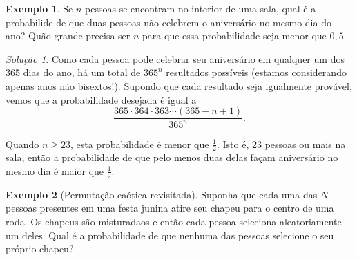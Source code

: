\documentclass[]{book}
\theoremstyle{definition}
\theoremstyle{definition}
\newtheorem{example}{Exemplo}[chapter]
\theoremstyle{definition}
\theoremstyle{remark}
\newtheorem*{solution}{Solução}
\begin{document}
\begin{example}
\protect\hypertarget{exm:unnamed-chunk-112}{}{\label{exm:unnamed-chunk-112} }Se \(n\) pessoas se encontram no interior de uma sala, qual é a probabilide de que duas pessoas não celebrem o aniversário no mesmo dia do ano?
Quão grande precisa ser \(n\) para que essa probabilidade seja menor que \(0{,}5\).
\end{example}

\begin{solution}
\iffalse{} {Solução. } \fi{}Como cada pessoa pode celebrar seu aniversário em qualquer um dos 365 dias do ano, há um total de \(365^n\) resultados possíveis (estamos considerando apenas anos não bisextos!).
Supondo que cada resultado seja igualmente provável, vemos que a probabilidade desejada é igual a
\[\frac{365\cdot 364\cdot 363 \cdots (365-n+1)}{365^n}.\]

Quando \(n\geq 23\), esta probabilidade é menor que \(\frac{1}{2}\).
Isto é, 23 pessoas ou mais na sala, então a probabilidade de que pelo menos duas delas façam aniversário no mesmo dia é maior que \(\frac{1}{2}\).
\end{solution}

\begin{example}[Permutação caótica revisitada]
\protect\hypertarget{exm:unnamed-chunk-114}{}{\label{exm:unnamed-chunk-114} \iffalse (Permutação caótica revisitada) \fi{} }Suponha que cada uma das \(N\) pessoas presentes em uma festa junina atire seu chapeu para o centro de uma roda.
Os chapeus são misturadaos e então cada pessoa seleciona aleatoriamente um deles.
Qual é a probabilidade de que nenhuma das pessoas selecione o seu próprio chapeu?
\end{example}
\end{document}
